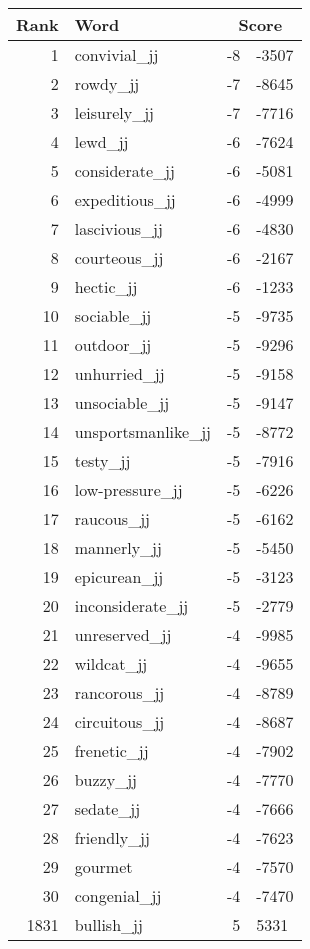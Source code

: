 \begin{longtable}[!htbp]{| rlr@{.}l |}
    \hline
    \textbf{Rank} & \textbf{Word} & \multicolumn{2}{c|}{\textbf{Score}} \\
    \hline
    \endhead
    1 & convivial\_jj & -8 & -3507 \\
    2 & rowdy\_jj & -7 & -8645 \\
    3 & leisurely\_jj & -7 & -7716 \\
    4 & lewd\_jj & -6 & -7624 \\
    5 & considerate\_jj & -6 & -5081 \\
    6 & expeditious\_jj & -6 & -4999 \\
    7 & lascivious\_jj & -6 & -4830 \\
    8 & courteous\_jj & -6 & -2167 \\
    9 & hectic\_jj & -6 & -1233 \\
    10 & sociable\_jj & -5 & -9735 \\
    11 & outdoor\_jj & -5 & -9296 \\
    12 & unhurried\_jj & -5 & -9158 \\
    13 & unsociable\_jj & -5 & -9147 \\
    14 & unsportsmanlike\_jj & -5 & -8772 \\
    15 & testy\_jj & -5 & -7916 \\
    16 & low-pressure\_jj & -5 & -6226 \\
    17 & raucous\_jj & -5 & -6162 \\
    18 & mannerly\_jj & -5 & -5450 \\
    19 & epicurean\_jj & -5 & -3123 \\
    20 & inconsiderate\_jj & -5 & -2779 \\
    21 & unreserved\_jj & -4 & -9985 \\
    22 & wildcat\_jj & -4 & -9655 \\
    23 & rancorous\_jj & -4 & -8789 \\
    24 & circuitous\_jj & -4 & -8687 \\
    25 & frenetic\_jj & -4 & -7902 \\
    26 & buzzy\_jj & -4 & -7770 \\
    27 & sedate\_jj & -4 & -7666 \\
    28 & friendly\_jj & -4 & -7623 \\
    29 & gourmet & -4 & -7570 \\
    30 & congenial\_jj & -4 & -7470 \\
    1831 & bullish\_jj & 5 & 5331 \\

\end{longtable}
